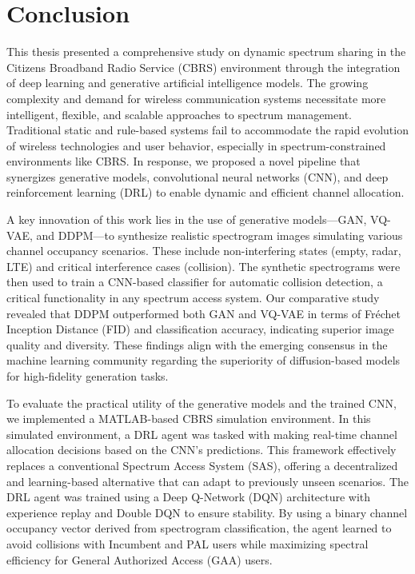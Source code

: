 \chapter{Conclusion}
\label{chap:conclusion}

This thesis presented a comprehensive study on dynamic spectrum sharing in the Citizens Broadband Radio Service (CBRS) environment through the integration of deep learning and generative artificial intelligence models. The growing complexity and demand for wireless communication systems necessitate more intelligent, flexible, and scalable approaches to spectrum management. Traditional static and rule-based systems fail to accommodate the rapid evolution of wireless technologies and user behavior, especially in spectrum-constrained environments like CBRS. In response, we proposed a novel pipeline that synergizes generative models, convolutional neural networks (CNN), and deep reinforcement learning (DRL) to enable dynamic and efficient channel allocation.

A key innovation of this work lies in the use of generative models—GAN, VQ-VAE, and DDPM—to synthesize realistic spectrogram images simulating various channel occupancy scenarios. These include non-interfering states (empty, radar, LTE) and critical interference cases (collision). The synthetic spectrograms were then used to train a CNN-based classifier for automatic collision detection, a critical functionality in any spectrum access system. Our comparative study revealed that DDPM outperformed both GAN and VQ-VAE in terms of Fréchet Inception Distance (FID) and classification accuracy, indicating superior image quality and diversity. These findings align with the emerging consensus in the machine learning community regarding the superiority of diffusion-based models for high-fidelity generation tasks.

To evaluate the practical utility of the generative models and the trained CNN, we implemented a MATLAB-based CBRS simulation environment. In this simulated environment, a DRL agent was tasked with making real-time channel allocation decisions based on the CNN’s predictions. This framework effectively replaces a conventional Spectrum Access System (SAS), offering a decentralized and learning-based alternative that can adapt to previously unseen scenarios. The DRL agent was trained using a Deep Q-Network (DQN) architecture with experience replay and Double DQN to ensure stability. By using a binary channel occupancy vector derived from spectrogram classification, the agent learned to avoid collisions with Incumbent and PAL users while maximizing spectral efficiency for General Authorized Access (GAA) users.

